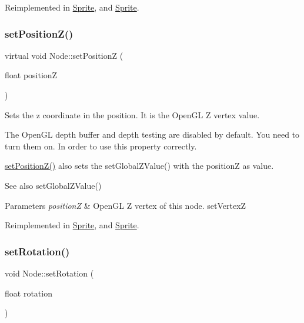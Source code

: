 Reimplemented in \hyperlink{classSprite_a3ebbeab90f8e3f136fa9cce2c85ee197}{Sprite}, and \hyperlink{classSprite_ac22643ba4c10444cce30e0f100bfb041}{Sprite}.

\mbox{\label{classNode_acf44e31f8e5d05e54e5594228406ed76}} 
\subsubsection{\texorpdfstring{set\+Position\+Z()}{setPositionZ()}\hspace{0.1cm}{\footnotesize\ttfamily [2/2]}}
{\footnotesize\ttfamily virtual void Node\+::set\+PositionZ (\begin{DoxyParamCaption}\item[{float}]{positionZ }\end{DoxyParamCaption})\hspace{0.3cm}{\ttfamily [virtual]}}

Sets the \textquotesingle{}z\textquotesingle{} coordinate in the position. It is the Open\+GL Z vertex value.

The Open\+GL depth buffer and depth testing are disabled by default. You need to turn them on. In order to use this property correctly.

{\ttfamily \hyperlink{classNode_aaea9bcbb6e5972122c590b930b5a90b9}{set\+Position\+Z()}} also sets the {\ttfamily set\+Global\+Z\+Value()} with the positionZ as value.

\begin{DoxySeeAlso}{See also}
{\ttfamily set\+Global\+Z\+Value()}
\end{DoxySeeAlso}

\begin{DoxyParams}{Parameters}
{\em positionZ} & Open\+GL Z vertex of this node.  set\+VertexZ \\
\hline
\end{DoxyParams}


Reimplemented in \hyperlink{classSprite_a3ebbeab90f8e3f136fa9cce2c85ee197}{Sprite}, and \hyperlink{classSprite_ac22643ba4c10444cce30e0f100bfb041}{Sprite}.

\mbox{\label{classNode_a62dda439f77712f0d9b405ce887df676}} 
\subsubsection{\texorpdfstring{set\+Rotation()}{setRotation()}\hspace{0.1cm}{\footnotesize\ttfamily [1/2]}}
{\footnotesize\ttfamily void Node\+::set\+Rotation (\begin{DoxyParamCaption}\item[{float}]{rotation }\end{DoxyParamCaption})\hspace{0.3cm}{\ttfamily [virtual]}}



